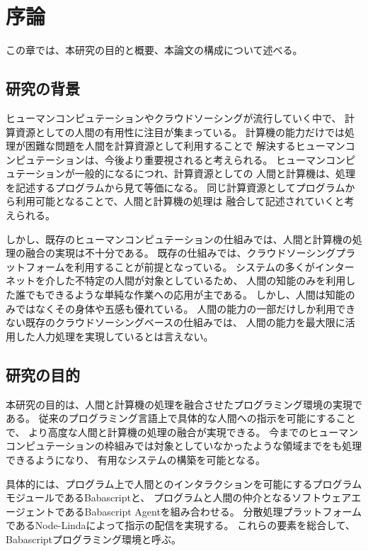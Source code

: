 \chapter{序論}\label{chap:introduction}

この章では、本研究の目的と概要、本論文の構成について述べる。

\section{研究の背景}\label{ux7814ux7a76ux306eux80ccux666f}

ヒューマンコンピュテーションやクラウドソーシングが流行していく中で、
計算資源としての人間の有用性に注目が集まっている。
計算機の能力だけでは処理が困難な問題を人間を計算資源として利用することで
解決するヒューマンコンピュテーションは、今後より重要視されると考えられる。
ヒューマンコンピュテーションが一般的になるにつれ、計算資源としての
人間と計算機は、処理を記述するプログラムから見て等価になる。
同じ計算資源としてプログラムから利用可能となることで、人間と計算機の処理は
融合して記述されていくと考えられる。

しかし、既存のヒューマンコンピュテーションの仕組みでは、人間と計算機の処理の融合の実現は不十分である。
既存の仕組みでは、クラウドソーシングプラットフォームを利用することが前提となっている。
システムの多くがインターネットを介した不特定の人間が対象としているため、
人間の知能のみを利用した誰でもできるような単純な作業への応用が主である。
しかし、人間は知能のみではなくその身体や五感も優れている。
人間の能力の一部だけしか利用できない既存のクラウドソーシングベースの仕組みでは、
人間の能力を最大限に活用した人力処理を実現しているとは言えない。

\section{研究の目的}\label{ux7814ux7a76ux306eux76eeux7684}

本研究の目的は、人間と計算機の処理を融合させたプログラミング環境の実現である。
従来のプログラミング言語上で具体的な人間への指示を可能にすることで、
より高度な人間と計算機の処理の融合が実現できる。
今までのヒューマンコンピュテーションの枠組みでは対象としていなかったような領域までをも処理できるようになり、
有用なシステムの構築を可能となる。

具体的には、プログラム上で人間とのインタラクションを可能にするプログラムモジュールであるBabascriptと、
プログラムと人間の仲介となるソフトウェアエージェントであるBabascript
Agentを組み合わせる。
分散処理プラットフォームであるNode-Lindaによって指示の配信を実現する。
これらの要素を総合して、Babascriptプログラミング環境と呼ぶ。

